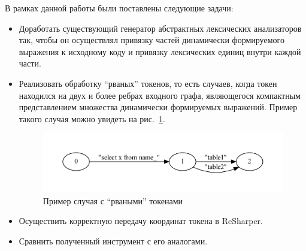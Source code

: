 В рамках данной работы были поставлены следующие задачи:
\begin{itemize}
\item Доработать существующий генератор абстрактных лексических анализаторов так, чтобы он осуществлял привязку частей динамически 
формируемого выражения к исходному коду и привязку лексических единиц внутри каждой части.
\item Реализовать обработку “рваных” токенов, то есть случаев, когда токен находился на двух и более ребрах входного графа, являющегося 
компактным представлением множества динамически формируемых выражений. Пример такого случая можно увидеть на рис.~\ref{fig:example_break}.

\begin{figure}[t]
\centering
\includegraphics[width=\textwidth]{Polubelova/example_break}
\caption{Пример случая с ``рваными'' токенами}
\label{fig:example_break} 
\end{figure}

\item Осуществить корректную передачу координат токена в ReSharper.
\item Сравнить полученный инструмент с его аналогами.
\end{itemize}

